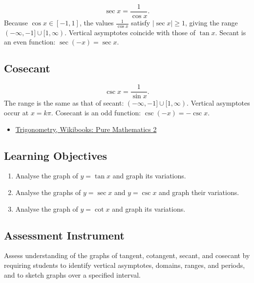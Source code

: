 \[
  \sec x = \frac{1}{\cos x}.
\]
Because $\cos x \in [-1, 1]$, the values $\frac{1}{\cos x}$ satisfy
$|\sec x| \geq 1$, giving the range $(-\infty, -1] \cup [1, \infty)$.
Vertical asymptotes coincide with those of $\tan x$.  Secant is an even
function: $\sec(-x) = \sec x$.

\subsection*{Cosecant}

\[
  \csc x = \frac{1}{\sin x}.
\]
The range is the same as that of secant: $(-\infty, -1] \cup [1, \infty)$.
Vertical asymptotes occur at $x = k\pi$.  Cosecant is an odd function:
$\csc(-x) = -\csc x$.

\begin{itemize}
  \item \href{https://en.wikibooks.org/wiki/A-level_Mathematics/CIE/Pure_Mathematics_2/Trigonometry}{Trigonometry, Wikibooks: Pure Mathematics 2}
\end{itemize}

\subsection{Learning Objectives}
\label{ssec:lear-fe6e}

\begin{enumerate}
    \item Analyse the graph of $y = \tan x$ and graph its variations.
    \item Analyse the graphs of $y = \sec x$ and $y = \csc x$ and graph their variations.
    \item Analyse the graph of $y = \cot x$ and graph its variations.
\end{enumerate}

\subsection{Assessment Instrument}
\label{ssec:asse-3669}

Assess understanding of the graphs of tangent, cotangent, secant, and cosecant by
requiring students to identify vertical asymptotes, domains, ranges, and periods, and to
sketch graphs over a specified interval.

